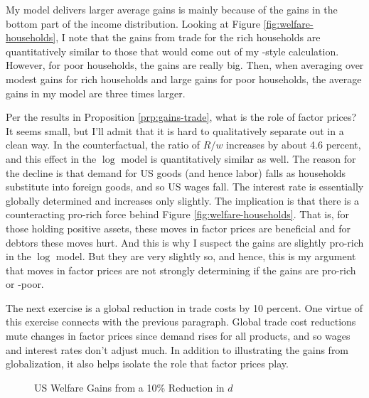 \documentclass[12pt,pdftex]{article}
\begin{document}
\begin{onehalfspacing}
My model delivers larger average gains is mainly because of the gains in the bottom part of the income distribution. Looking at Figure \ref{fig:welfare-households}, I note that the gains from trade for the rich households are quantitatively similar to those that would come out of my \citet{arkolakis2012new}-style calculation. However, for poor households, the gains are really big. Then, when averaging over modest gains for rich households and large gains for poor households, the average gains in my model are three times larger.

Per the results in Proposition \ref{prp:gains-trade}, what is the role of factor prices? It seems small, but I'll admit that it is hard to qualitatively separate out in a clean way. In the counterfactual, the ratio of $R/w$ increases by about 4.6 percent, and this effect in the $\log$ model is quantitatively similar as well. The reason for the decline is that demand for US goods (and hence labor) falls as households substitute into foreign goods, and so US wages fall. The interest rate is essentially globally determined and increases only slightly. The implication is that there is a counteracting pro-rich force behind Figure \ref{fig:welfare-households}. That is, for those holding positive assets, these moves in factor prices are beneficial and for debtors these moves hurt. And this is why I suspect the gains are slightly pro-rich in the $\log$ model. But they are very slightly so, and hence, this is my argument that moves in factor prices are not strongly determining if the gains are pro-rich or -poor.

The next exercise is a global reduction in trade costs by 10 percent. One virtue of this exercise connects with the previous paragraph. Global trade cost reductions mute changes in factor prices since demand rises for all products, and so wages and interest rates don't adjust much. In addition to illustrating the gains from globalization, it also helps isolate the role that factor prices play.

\begin{figure}[!t]
\caption{US Welfare Gains from a 10\% Reduction in $d$ }\label{fig:welfare-households-global}
\end{figure}


\end{onehalfspacing}
\end{document}
